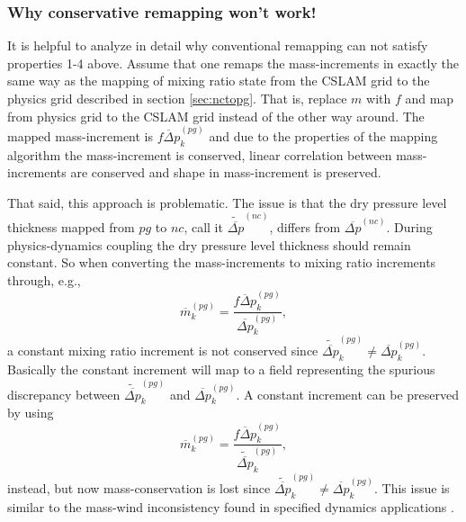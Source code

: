 \subsubsection{Why conservative remapping won't work!}
It is helpful to analyze in detail why conventional remapping can not satisfy properties 1-4 above. Assume that one remaps the mass-increments in exactly the same way as the mapping of mixing ratio state from the CSLAM grid to the physics grid described in section \ref{sec:nctopg}. That is, replace $m$ with $f$ and map from physics grid to the CSLAM grid instead of the other way around. The mapped mass-increment is $\overline{f\Delta p}^{(pg)}_k$ and due to the properties of the mapping algorithm the mass-increment is conserved, linear correlation between mass-increments are conserved and shape in mass-increment is preserved.

That said, this approach is problematic. The issue is that the dry pressure level thickness mapped from $pg$ to $nc$, call it $\widetilde{\overline{\Delta p}}^{(nc)}$, differs from $\overline{\Delta p}^{(nc)}$. During physics-dynamics coupling the dry pressure level thickness should remain constant. So when converting the mass-increments to mixing ratio increments through, e.g.,
\begin{equation}
\overline{m}^{(pg)}_k=\frac{\overline{f\Delta p}^{(pg)}_k}{\overline{\Delta p}^{(pg)}_k},
\end{equation}
a constant mixing ratio increment is not conserved since $\widetilde{\overline{\Delta p}}^{(pg)}_k\ne {\overline{\Delta p}}^{(pg)}_k$. Basically the constant increment will map to a field representing the spurious discrepancy between $\widetilde{\overline{\Delta p}}^{(pg)}_k$ and ${\overline{\Delta p}}^{(pg)}_k$. A constant increment can be preserved by using
\begin{equation}
\overline{m}^{(pg)}_k=\frac{\overline{f\Delta p}^{(pg)}_k}{\widetilde{\overline{\Delta p}}^{(pg)}_k},
\end{equation}
instead, but now mass-conservation is lost since $\widetilde{\overline{\Delta p}}^{(pg)}_k\ne {\overline{\Delta p}}^{(pg)}_k$. This issue is similar to the mass-wind inconsistency found in specified dynamics applications \citep[e.g.][]{JKLSBCRE2001QJR}. 

